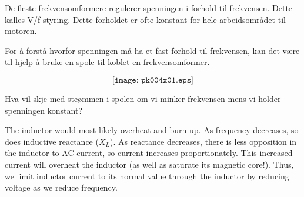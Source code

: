 


De fleste frekvensomformere regulerer spenningen i forhold til frekvensen. Dette kalles V/f styring. Dette forholdet er ofte konstant for hele arbeidsområdet til motoren. 

For å forstå hvorfor spenningen må ha et fast forhold til frekvensen, kan det være til hjelp å bruke en spole til koblet en frekvensomformer. 


$$\texttt{[image: pk004x01.eps]}$$

Hva vil skje med steømmen i spolen om vi minker frekvensen mens vi holder spenningen konstant?\\







The inductor would most likely overheat and burn up.  As frequency decreases, so does inductive reactance ($X_L$).  As reactance decreases, there is less opposition in the inductor to AC current, so current increases proportionately.  This increased current will overheat the inductor (as well as saturate its magnetic core!).  Thus, we limit inductor current to its normal value through the inductor by reducing voltage as we reduce frequency.











